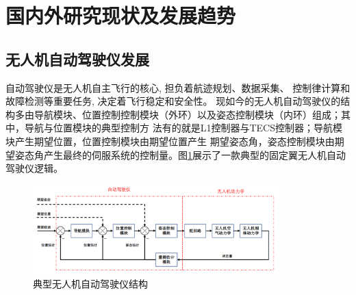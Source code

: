 \section{国内外研究现状及发展趋势}
\subsection{无人机自动驾驶仪发展}
自动驾驶仪是无人机自主飞行的核心, 担负着航迹规划、数据采集、 控制律计算和故障检测等重要任务, 决定着飞行稳定和安全性。\cite{LiuLi2010}
现如今的无人机自动驾驶仪的结构多由导航模块、位置控制控制模块（外环）以及姿态控制模块（内环）组成；其中，导航与位置模块的典型控制方
法有的就是L1控制器\cite{Park_2004}与TECS控制器\cite{Lambregts1983Vertical}；导航模块产生期望位置，位置控制模块由期望位置产生
期望姿态角，姿态控制模块由期望姿态角产生最终的伺服系统的控制量。图\ref{fig-c1-autopilot}展示了一款典型的固定翼无人机自动驾驶仪逻辑。
\begin{figure}[H]
    \centering
    \includegraphics[width=0.85\textwidth]{figures/c1/autopilot_struct}
    \caption{典型无人机自动驾驶仪结构}\label{fig-c1-autopilot}
\end{figure}
